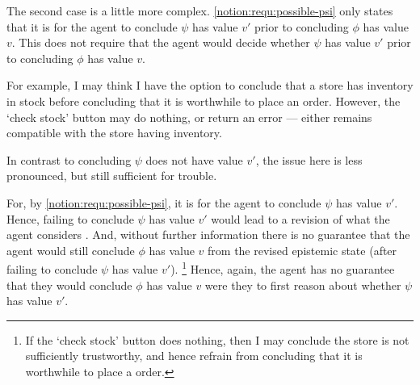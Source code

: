 \begin{note}
  The second case is a little more complex.
  \ref{notion:requ:possible-psi} only states that it is \epVAd{} for the agent to conclude \(\psi\) has value \(v'\) prior to concluding \(\phi\) has value \(v\).
  This does not require that the agent would decide whether \(\psi\) has value \(v'\) prior to concluding \(\phi\) has value \(v\).

  For example, I may think I have the option to conclude that a store has inventory in stock before concluding that it is worthwhile to place an order.
  However, the `check stock' button may do nothing, or return an error --- either remains compatible with the store having inventory.

  In contrast to concluding \(\psi\) does not have value \(v'\), the issue here is less pronounced, but still sufficient for trouble.

  For, by \ref{notion:requ:possible-psi}, it is \epVAd{} for the agent to conclude \(\psi\) has value \(v'\).
  Hence, failing to conclude \(\psi\) has value \(v'\) would lead to a revision of what the agent considers \epVAd{}.
  And, without further information there is no guarantee that the agent would still conclude \(\phi\) has value \(v\) from the revised epistemic state (after failing to conclude \(\psi\) has value \(v'\)).\nolinebreak
  \footnote{
    If the `check stock' button does nothing, then I may conclude the store is not sufficiently trustworthy, and hence refrain from concluding that it is worthwhile to place a order.
  }
  Hence, again, the agent has no guarantee that they would conclude \(\phi\) has value \(v\) were they to first reason about whether \(\psi\) has value \(v'\).
\end{note}

